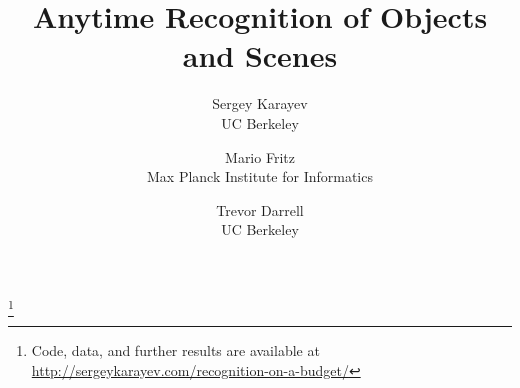 \documentclass[10pt,twocolumn,letterpaper]{article}
\newcommand\blfootnote[1]{%
  \begingroup
  \renewcommand\thefootnote{}\footnote{#1}%
  \addtocounter{footnote}{-1}%
  \endgroup
}
\begin{document}

\title{Anytime Recognition of Objects and Scenes}

\author{
Sergey Karayev\\
UC Berkeley
\and
Mario Fritz\\
Max Planck Institute for Informatics
\and
Trevor Darrell\\
UC Berkeley
}

\maketitle
\blfootnote{Code, data, and further results are available at\\\url{http://sergeykarayev.com/recognition-on-a-budget/}}




\end{document}
